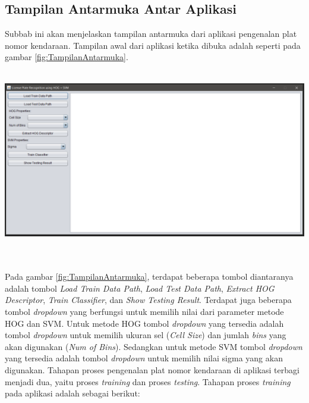 \subsection{Tampilan Antarmuka Antar Aplikasi}
\noindent Subbab ini akan menjelaskan tampilan antarmuka dari aplikasi pengenalan plat nomor kendaraan. Tampilan awal dari aplikasi ketika dibuka adalah seperti pada gambar \ref{fig:TampilanAntarmuka}. \\
\\
\begin{adjustbox}{width=1\textwidth}
	\noindent\begin{minipage}{\linewidth}
		\centering\includegraphics[width=14cm]{images/TampilanAntarmuka.png}
		\label{fig:TampilanAntarmuka}
	\end{minipage}
\end{adjustbox}\\
\\
\noindent Pada gambar \ref{fig:TampilanAntarmuka}, terdapat beberapa tombol diantaranya adalah tombol \textit{Load Train Data Path}, \textit{Load Test Data Path}, \textit{Extract HOG Descriptor}, \textit{Train Classifier}, dan \textit{Show Testing Result}. Terdapat juga beberapa tombol \textit{dropdown} yang berfungsi untuk memilih nilai dari parameter metode HOG dan SVM. Untuk metode HOG tombol \textit{dropdown} yang tersedia adalah tombol \textit{dropdown} untuk memilih ukuran sel (\textit{Cell Size}) dan jumlah \textit{bins} yang akan digunakan (\textit{Num of Bins}). Sedangkan untuk metode SVM tombol \textit{dropdown} yang tersedia adalah tombol \textit{dropdown} untuk memilih nilai sigma yang akan digunakan. Tahapan proses pengenalan plat nomor kendaraan di aplikasi terbagi menjadi dua, yaitu proses \textit{training} dan proses \textit{testing}. Tahapan proses \textit{training} pada aplikasi adalah sebagai berikut:
